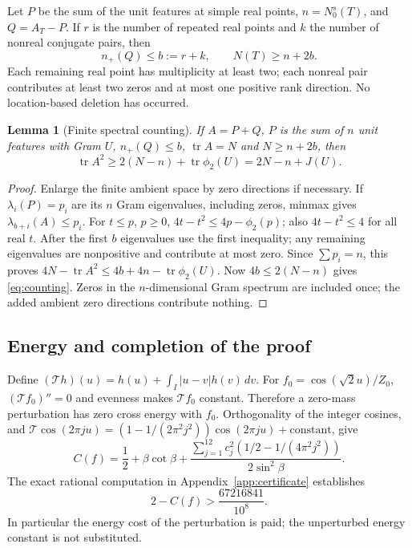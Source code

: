\documentclass[11pt,a4paper]{article}
\newtheorem{lemma}[theorem]{Lemma}
\theoremstyle{remark}
\DeclareMathOperator{\tr}{tr}
\begin{document}
Let $P$ be the sum of the unit features at simple real points,
$n=N_0^s(T)$, and $Q=A_T-P$. If $r$ is the number of repeated
real points and $k$ the number of nonreal conjugate pairs, then
\[
 n_+(Q)\le b:=r+k,\qquad N(T)\ge n+2b.
\]
Each remaining real point has multiplicity at least two; each
nonreal pair contributes at least two zeros and at most one
positive rank direction. No location-based deletion has occurred.

\begin{lemma}[Finite spectral counting]\label{lem:counting}
If $A=P+Q$, $P$ is the sum of $n$ unit features with Gram $U$,
$n_+(Q)\le b$, $\tr A=N$ and $N\ge n+2b$, then
\begin{equation}\label{eq:counting}
 \tr A^2\ge2(N-n)+\tr\phi_2(U)
           =2N-n+J(U).
\end{equation}
\end{lemma}
\begin{proof}
Enlarge the finite ambient space by zero directions if necessary.
If $\lambda_i(P)=p_i$ are its $n$ Gram eigenvalues, including
zeros, minmax gives $\lambda_{b+i}(A)\le p_i$.
For $t\le p$, $p\ge0$,
$4t-t^2\le4p-\phi_2(p)$; also $4t-t^2\le4$ for all real $t$.
After the first $b$ eigenvalues use the first inequality; any
remaining eigenvalues are nonpositive and contribute at most zero.
Since $\sum p_i=n$, this proves
$4N-\tr A^2\le4b+4n-\tr\phi_2(U)$.
Now $4b\le2(N-n)$ gives \eqref{eq:counting}.
Zeros in the $n$-dimensional Gram spectrum are included once;
the added ambient zero directions contribute nothing.
\end{proof}

\subsection{Energy and completion of the proof}

Define $(\mathcal Th)(u)=h(u)+\int_I|u-v|h(v)\,dv$.
For $f_0=\cos(\sqrt2u)/Z_0$, $(\mathcal Tf_0)''=0$ and evenness
makes $\mathcal Tf_0$ constant. Therefore a zero-mass perturbation
has zero cross energy with $f_0$. Orthogonality of the integer
cosines, and
$\mathcal T\cos(2\pi ju)=(1-1/(2\pi^2j^2))\cos(2\pi ju)
+\text{constant}$, give
\begin{equation}\label{eq:amenergy}
 C(f)=\frac12+\beta\cot\beta+
 \frac{\displaystyle\sum_{j=1}^{12}c_j^2
           (1/2-1/(4\pi^2j^2))}{2\sin^2\beta}.
\end{equation}
The exact rational computation in Appendix~\ref{app:certificate}
establishes
\begin{equation}\label{eq:gainconstant}
 2-C(f)>\frac{67216841}{10^8}.
\end{equation}
In particular the energy cost of the perturbation is paid;
the unperturbed energy constant is not substituted.
\end{document}
